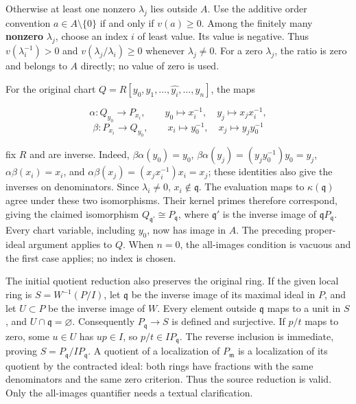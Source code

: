 Otherwise at least one nonzero \(\lambda_j\) lies outside \(A\). Use the additive order convention \(a\in A\setminus\{0\}\) if and only if \(v(a)\geq0\). Among the finitely many \textbf{nonzero} \(\lambda_j\), choose an index \(i\) of least value. Its value is negative. Thus \(v(\lambda_i^{-1})>0\) and \(v(\lambda_j/\lambda_i)\geq0\) whenever \(\lambda_j\ne0\). For a zero \(\lambda_j\), the ratio is zero and belongs to \(A\) directly; no value of zero is used.

For the original chart \(Q=R[y_0,y_1,\ldots,\widehat{y_i},\ldots,y_n]\), the maps

\[
\alpha:Q_{y_0}\longrightarrow P_{x_i},\qquad
y_0\longmapsto x_i^{-1},\quad y_j\longmapsto x_jx_i^{-1},
\] \[
\beta:P_{x_i}\longrightarrow Q_{y_0},\qquad
x_i\longmapsto y_0^{-1},\quad x_j\longmapsto y_jy_0^{-1}
\]

fix \(R\) and are inverse. Indeed, \(\beta\alpha(y_0)=y_0\), \(\beta\alpha(y_j)=(y_jy_0^{-1})y_0=y_j\), \(\alpha\beta(x_i)=x_i\), and \(\alpha\beta(x_j)=(x_jx_i^{-1})x_i=x_j\); these identities also give the inverses on denominators. Since \(\lambda_i\ne0\), \(x_i\notin\mathfrak q\). The evaluation maps to \(\kappa(\mathfrak q)\) agree under these two isomorphisms. Their kernel primes therefore correspond, giving the claimed isomorphism \(Q_{\mathfrak q'}\cong P_{\mathfrak q}\), where \(\mathfrak q'\) is the inverse image of \(\mathfrak qP_{\mathfrak q}\). Every chart variable, including \(y_0\), now has image in \(A\). The preceding proper-ideal argument applies to \(Q\). When \(n=0\), the all-images condition is vacuous and the first case applies; no index is chosen.

The initial quotient reduction also preserves the original ring. If the given local ring is \(S=W^{-1}(P/I)\), let \(\mathfrak q\) be the inverse image of its maximal ideal in \(P\), and let \(U\subset P\) be the inverse image of \(W\). Every element outside \(\mathfrak q\) maps to a unit in \(S\), and \(U\cap\mathfrak q=\varnothing\). Consequently \(P_{\mathfrak q}\to S\) is defined and surjective. If \(p/t\) maps to zero, some \(u\in U\) has \(up\in I\), so \(p/t\in IP_{\mathfrak q}\). The reverse inclusion is immediate, proving \(S=P_{\mathfrak q}/IP_{\mathfrak q}\). A quotient of a localization of \(P_{\mathfrak m}\) is a localization of its quotient by the contracted ideal: both rings have fractions with the same denominators and the same zero criterion. Thus the source reduction is valid. Only the all-images quantifier needs a textual clarification.

